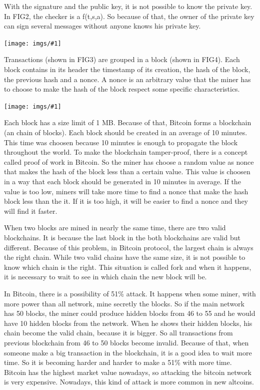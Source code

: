 \documentclass[12pt]{article}
\newcommand{\incimg}[1]{\texttt{[image: imgs/\#1]}}
\begin{document}
With the signature and the public key, it is not possible to know the private key.
In FIG2, the checker is a f(t,s,a).
So because of that, the owner of the private key can sign several messages without anyone knows
his private key.

\incimg{transactions2.jpg}

Transactions (shown in FIG3) are grouped in a block (shown in FIG4).
Each block contains in its header the timestamp of its creation, the hash of the block,
the previous hash and a nonce.
A nonce is an arbitrary value that the miner has to choose to make the hash of the block respect some
specific characteristics.

\incimg{blockchain.png}

Each block has a size limit of 1 MB.
Because of that, Bitcoin forms a blockchain (an chain of blocks).
Each block should be created in an average of 10 minutes.
This time was choosen because 10 minutes is enough to propagate the block throughout the world.
To make the blockchain tamper-proof, there is a concept called proof of work in Bitcoin.
So the miner has choose a random value as nonce that makes the hash of the block less
than a certain value.
This value is choosen in a way that each block should be generated in 10 minutes in average.
If the value is too low, miners will take more time to find a nonce that make the hash block
less than the it.
If it is too high, it will be easier to find a nonce and they will find it faster.

When two blocks are mined in nearly the same time, there are two valid blockchains.
It is because the last block in the both blockchains are valid but different.
Because of this problem, in Bitcoin protocol, the largest chain is always the right chain.
While two valid chains have the same size, it is not possible to know which chain is the right.
This situation is called fork and when it happens, it is necessary to wait to see in which chain
the new block will be.

In Bitcoin, there is a possibility of 51\% attack.
It happens when some miner, with more power than all network, mine secretly the blocks.
So if the main network has 50 blocks, the miner could produce hidden blocks from 46 to 55
and he would have 10 hidden blocks from the network.
When he shows their hidden blocks, his chain become the valid chain, because it is bigger.
So all transactions from previous blockchain from 46 to 50 blocks become invalid.
Because of that, when someone make a big transaction in the blockchain, it is a good idea
to wait more time.
So it is becoming harder and harder to make a 51\% with more time.
Bitcoin has the highest market value nowadays, so attacking the bitcoin network is very expensive.
Nowadays, this kind of attack is more common in new altcoins.
\end{document}
